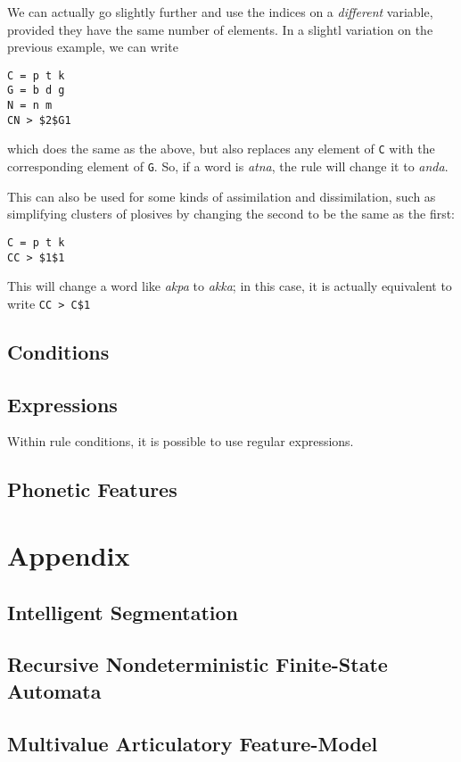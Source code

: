 \documentclass[10pt,letterpaper]{article}
\begin{document}
We can actually go slightly further and use the indices on a \emph{different} variable, provided they have the same number of elements. In a slightl variation on the previous example, we can write

\begin{verbatim}
C = p t k
G = b d g
N = n m
CN > $2$G1
\end{verbatim}
\noindent
which does the same as the above, but also replaces any element of \texttt{C} with the corresponding element of \texttt{G}. So, if a word is \emph{atna}, the rule will change it to \emph{anda}.

This can also be used for some kinds of assimilation and dissimilation, such as simplifying clusters of plosives by changing the second to be the same as the first:

\begin{verbatim}
C = p t k
CC > $1$1
\end{verbatim}
\noindent
This will change a word like \emph{akpa} to \emph{akka}; in this case, it is actually equivalent to write \texttt{CC > C\$1}


\subsection{Conditions}\label{sec:conditions}

\subsection{Expressions}\label{sec:expressions}
Within rule conditions, it is possible to use regular expressions.

\subsection{Phonetic Features}\label{sec:features}

\section{Appendix}\label{sec:appendix}

\subsection{Intelligent Segmentation}\label{sec:segmentation}

\subsection{Recursive Nondeterministic Finite-State Automata}\label{sec:rndfa}

\subsection{Multivalue Articulatory Feature-Model}\label{sec:mafm}
\end{document}
